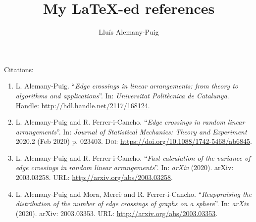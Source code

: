 \documentclass[12pt]{article}
\begin{document}
\title{My \LaTeX-ed references}
\author{
	Llu\'is Alemany-Puig
}

\maketitle

Citations:
\begin{enumerate}
	\item[\cite{Alemany2019a}] L. Alemany-Puig. ``{\em Edge crossings in linear arrangements: from theory to algorithms and applications}''. In: {\em Universitat Politècnica de Catalunya}. Handle: \url{http://hdl.handle.net/2117/168124}.
	
	\item[\cite{Alemany2020a}] L. Alemany-Puig and R. Ferrer-i-Cancho. ``{\em Edge crossings in random linear arrangements}''. In: {\em Journal of Statistical Mechanics: Theory and Experiment} 2020.2 (Feb 2020) p. 023403. \textsc{Doi}: \url{https://doi.org/10.1088/1742-5468/ab6845}.

	\item[\cite{Alemany2020c}] L. Alemany-Puig and R. Ferrer-i-Cancho. ``{\em Fast calculation of the variance of edge crossings in random linear arrangements}''. In: {\em arXiv} (2020). arXiv: 2003.03258. URL: \url{http://arxiv.org/abs/2003.03258}.
	
	\item[\cite{Alemany2020b}] L. Alemany-Puig and Mora, Merc\`{e} and R. Ferrer-i-Cancho. ``{\em Reappraising the distribution of the number of edge crossings of graphs on a sphere}''. In: {\em arXiv} (2020). arXiv: 2003.03353. URL: \url{http://arxiv.org/abs/2003.03353}.
\end{enumerate}

\printbibliography
\end{document}
